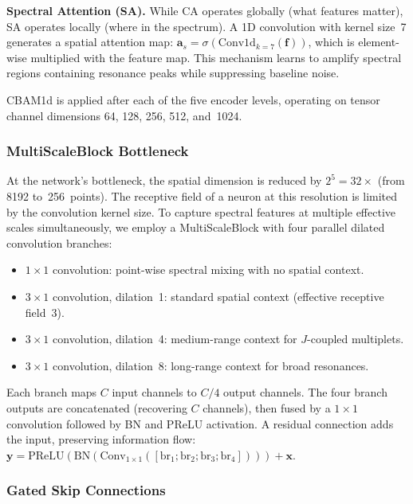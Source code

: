 \documentclass{article}
\begin{document}
\textbf{Spectral Attention (SA).} While CA operates globally (what features matter), SA operates locally (where in the spectrum). A 1D convolution with kernel size~7 generates a spatial attention map: $\mathbf{a}_s = \sigma(\mathrm{Conv1d}_{k=7}(\mathbf{f}))$, which is element-wise multiplied with the feature map. This mechanism learns to amplify spectral regions containing resonance peaks while suppressing baseline noise.

CBAM1d is applied after each of the five encoder levels, operating on tensor channel dimensions 64, 128, 256, 512, and~1024.

\subsubsection{MultiScaleBlock Bottleneck}

At the network's bottleneck, the spatial dimension is reduced by $2^5 = 32\times$ (from 8192 to~256~points). The receptive field of a neuron at this resolution is limited by the convolution kernel size. To capture spectral features at multiple effective scales simultaneously, we employ a MultiScaleBlock with four parallel dilated convolution branches:

\begin{itemize}[leftmargin=*, itemsep=1pt]
    \item $1\times1$ convolution: point-wise spectral mixing with no spatial context.
    \item $3\times1$ convolution, dilation~1: standard spatial context (effective receptive field~3).
    \item $3\times1$ convolution, dilation~4: medium-range context for $J$-coupled multiplets.
    \item $3\times1$ convolution, dilation~8: long-range context for broad resonances.
\end{itemize}

Each branch maps $C$ input channels to $C/4$ output channels. The four branch outputs are concatenated (recovering $C$ channels), then fused by a $1\times1$ convolution followed by BN and PReLU activation. A residual connection adds the input, preserving information flow: $\mathbf{y} = \mathrm{PReLU}(\mathrm{BN}(\mathrm{Conv}_{1\times1}([\mathrm{br}_1; \mathrm{br}_2; \mathrm{br}_3; \mathrm{br}_4]))) + \mathbf{x}$.

\subsubsection{Gated Skip Connections}
\end{document}
